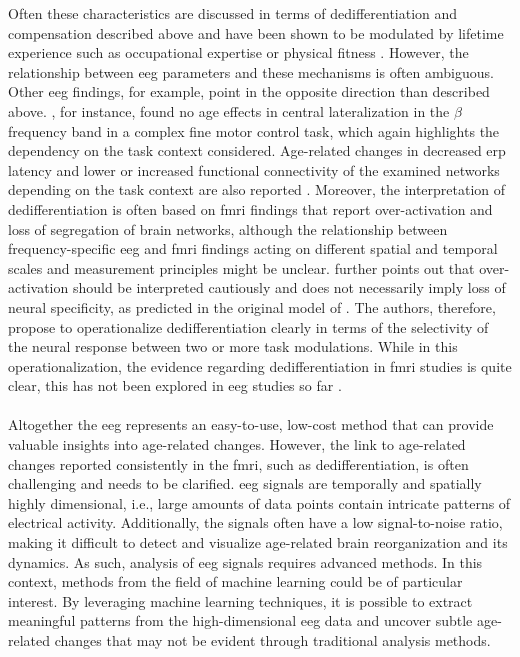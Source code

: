 Often these characteristics are discussed in terms of dedifferentiation and compensation described above and have been shown to be modulated by lifetime experience such as occupational expertise \cite{Vieluf2018} or physical fitness \cite{Douw2014}. However, the relationship between \gls{eeg} parameters and these mechanisms is often ambiguous. Other \gls{eeg} findings, for example, point in the opposite direction than described above. \citeauthor{Hübner2018a} \cite{Hübner2018a}, for instance, found no age effects in central lateralization in the $\beta$ frequency band in a complex fine motor control task, which again highlights the dependency on the task context considered. Age-related changes in decreased \gls{erp} latency and lower or increased functional connectivity of the examined networks depending on the task context are also reported \cite{Courtney2021}. Moreover, the interpretation of dedifferentiation is often based on \gls{fmri} findings that report over-activation and loss of segregation of brain networks, although the relationship between frequency-specific \gls{eeg} and \gls{fmri} findings acting on different spatial and temporal scales and measurement principles might be unclear. \citeauthor{Koen2019} \cite{Koen2019} further points out that over-activation should be interpreted cautiously and does not necessarily imply loss of neural specificity, as predicted in the original model of \citeauthor{Li2000} \cite{Li2000,Li2001}. The authors, therefore, propose to operationalize dedifferentiation clearly in terms of the selectivity of the neural response between two or more task modulations. While in this operationalization, the evidence regarding dedifferentiation in \gls{fmri} studies is quite clear, this has not been explored in \gls{eeg} studies so far \cite{Koen2019}.\\
\\
Altogether the \gls{eeg} represents an easy-to-use, low-cost method that can provide valuable insights into age-related changes. However, the link to age-related changes reported consistently in the \gls{fmri}, such as dedifferentiation, is often challenging and needs to be clarified. \Gls{eeg} signals are temporally and spatially highly dimensional, i.e., large amounts of data points contain intricate patterns of electrical activity. Additionally, the signals often have a low signal-to-noise ratio, making it difficult to detect and visualize age-related brain reorganization and its dynamics. As such, analysis of \gls{eeg} signals requires advanced methods. In this context, methods from the field of machine learning could be of particular interest. By leveraging machine learning techniques, it is possible to extract meaningful patterns from the high-dimensional \gls{eeg} data and uncover subtle age-related changes that may not be evident through traditional analysis methods.

